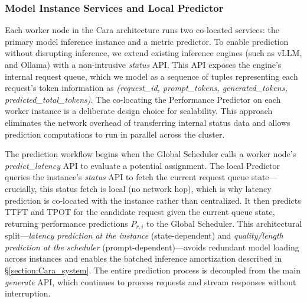 \documentclass[letterpaper, anonymous, twocolumn, 10pt]{article}
\begin{document}
\subsubsection{Model Instance Services and Local Predictor}

Each worker node in the Cara architecture runs two co-located services: the primary model inference instance and a metric predictor. To enable prediction without disrupting inference, we extend existing inference engines (such as vLLM, and Ollama) with a non-intrusive \textit{status} API. This API exposes the engine's internal request queue, which we model as a sequence of tuples representing each request's token information as \textit{(request\_id, prompt\_tokens, generated\_tokens, predicted\_total\_tokens)}. The co-locating the Performance Predictor on each worker instance is a deliberate design choice for scalability. This approach eliminates the network overhead of transferring internal status data and allows prediction computations to run in parallel across the cluster.

The prediction workflow begins when the Global Scheduler calls a worker node's \textit{predict\_latency} API to evaluate a potential assignment. The local Predictor queries the instance's \textit{status} API to fetch the current request queue state---crucially, this status fetch is local (no network hop), which is why latency prediction is co-located with the instance rather than centralized.
It then predicts TTFT and TPOT for the candidate request given the current queue state, returning performance predictions $P_{r,i}$ to the Global Scheduler.
This architectural split---\emph{latency prediction at the instance} (state-dependent) and \emph{quality/length prediction at the scheduler} (prompt-dependent)---avoids redundant model loading across instances and enables the batched inference amortization described in \S\ref{section:Cara_system}.
The entire prediction process is decoupled from the main \textit{generate} API, which continues to process requests and stream responses without interruption.
\end{document}

